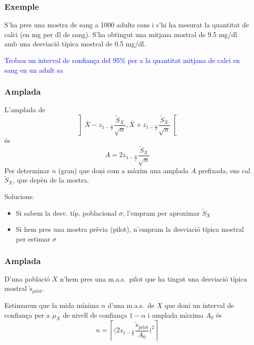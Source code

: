 \documentclass[12pt,t]{beamer}
\newcommand{\blue}[1]{\textcolor{blue}{#1}}
\renewcommand{\emph}[1]{{\color{red}#1}}
\theoremstyle{plain}
\theoremstyle{definition}
\begin{document}
\begin{frame}
\frametitle{Exemple}
\vspace*{-2ex}

S'ha pres una mostra de sang a 1000 adults sans i s'hi ha mesurat la quantitat  de calci (en mg per dl de sang). S'ha obtingut una mitjana mostral de 9.5 mg/dl amb una desviació típica mostral de 0.5 mg/dl. 
\medskip

\blue{Trobau un interval de confiança del 95\% per a la quantitat mitjana de calci en sang en un adult sa}

\end{frame}



\begin{frame}
\frametitle{Amplada}

L'amplada de 
$$
\left]\overline{X}-z_{1-\frac{\alpha}{2}}\frac{\widetilde{S}_X}{\sqrt{n}},
    \overline{X}+z_{1-\frac{\alpha}{2}}\frac{\widetilde{S}_X}{\sqrt{n}}\right[
$$
és 
$$
A=2z_{1-\frac{\alpha}{2}}\frac{\widetilde{S}_X}{\sqrt{n}}
$$
Per determinar $n$ (gran) que doni com a màxim una amplada $A$ prefixada, ens cal $\widetilde{S}_X$, que depèn de la mostra.
\medskip

 Solucions:
\begin{itemize}
\item Si sabem la desv. típ. poblacional $\sigma$, l'empram per aproximar $\widetilde{S}_X$

\item Si hem pres una mostra prèvia (\emph{pilot}), n'empram la desviació típica mostral per estimar $\sigma$

\end{itemize}



\end{frame}



\begin{frame}
\frametitle{Amplada}

\begin{block}{}
D'una població $X$ n'hem pres una  \emph{m.a.s.\ pilot} que ha tingut una desviació típica mostral $\widetilde{s}_{pilot}$.
\medskip

Estimarem que la mida mínima $n$ d'una m.a.s.\ de $X$ que doni un interval de confiança per a $\mu_X$ de nivell de confiança $1-\alpha$ i amplada màxima $A_0$ és
$$
n=\left\lceil \Big(2z_{1-\frac{\alpha}{2}}\frac{\widetilde{s}_{pilot}}{A_0}\Big)^2\right\rceil
$$
\end{block}



\end{frame}
\end{document}
